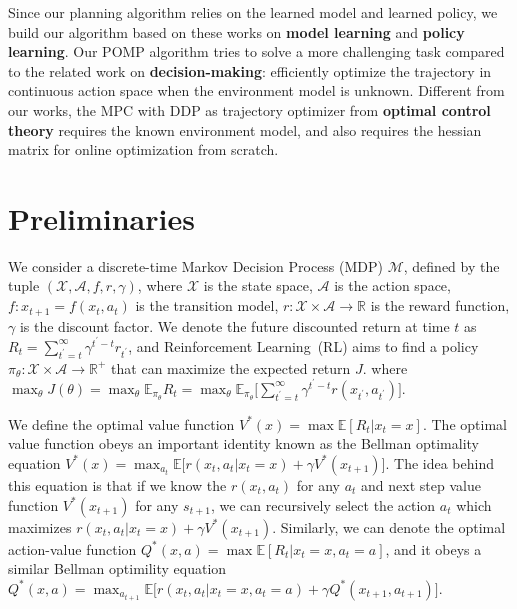 \documentclass{article}
\begin{document}
Since our planning algorithm relies on the learned model and learned policy, we build our algorithm based on these works on \textbf{model learning} and \textbf{policy learning}.
Our POMP algorithm tries to solve a more challenging task compared to the related work on \textbf{decision-making}: efficiently optimize the trajectory in continuous action space when the environment model is unknown. 
Different from our works, the MPC with DDP as trajectory optimizer from \textbf{optimal control theory}  requires the known environment model, and also requires the  hessian matrix  for  online optimization from scratch.  

    

\section{Preliminaries}
We consider a discrete-time Markov Decision Process (MDP) $\mathcal{M}$, defined by the tuple $\left(\mathcal{X}, \mathcal{A}, f, r, \gamma \right)$, where $\mathcal{X}$ is the state space, $\mathcal{A}$ is the action space, $f:x_{t+1}=f(x_t, a_t)$ is the transition model,  $r:\mathcal{X}\times\mathcal{A}\rightarrow \mathbb{R}$ is the reward function, $\gamma$ is the discount factor. We denote the future discounted return at time $t$ as $R_t=\sum_{t^\prime =t}^{\infty} \gamma^{t^\prime -t}r_{t^\prime}$, and Reinforcement Learning~(RL) aims to find a policy $\pi_\theta:\mathcal{X}\times\mathcal{A}\rightarrow \mathbb{R}^+$ that can maximize the expected return $J$. 
where $\max_{\theta} J(\theta) = \max_{\theta} \mathbb{E}_{\pi_\theta} R_t =  \max_{\theta} \mathbb{E}_{\pi_\theta} \Big[ \sum_{t^\prime =t}^{\infty} \gamma^{t^\prime -t} r(x_{t^\prime}, a_{t^\prime})\Big]$.

 We define the optimal value function {\small $V^{*}(x) = \max \mathbb{E}[R_t| x_t=x]$}. The optimal value function obeys an important identity known as the Bellman optimality equation $V^{*}(x) = \max_{a_t} \mathbb{E}\Big[r(x_t, a_t|x_t=x) + \gamma V^{*}(x_{t+1})\Big]$. The idea behind this equation is that if we know the $r(x_t, a_t)$ for any $a_t$ and next step value function $ V^{*}(x_{t+1})$ for any $s_{t+1}$, we can recursively select the action $a_t$ which maximizes $r(x_t, a_t|x_t=x) + \gamma V^{*}(x_{t+1})$. Similarly, we can denote the optimal action-value function $Q^*(x, a) = \max \mathbb{E}[R_t|x_t=x, a_t=a]$, and it obeys a similar Bellman optimility equation {\small $Q^*(x,a)=\max_{a_{t+1}} \mathbb{E}\Big[r(x_t, a_t|x_t=x, a_t=a) + \gamma Q^{*}(x_{t+1}, a_{t+1}) \Big]$}.
\end{document}
